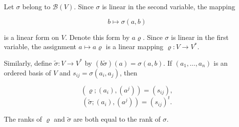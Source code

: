 Let $\sigma$ belong to $\mathcal{B}(V)$. Since $\sigma$ is linear in the second variable, the mapping

$$b \mapsto \sigma(a, b)$$

is a linear form on $V$. Denote this form by $a\varrho$. Since $\sigma$ is linear in the first variable, the assignment $a \mapsto a\varrho$ is a linear mapping $\varrho: V \to V^*$.

Similarly, define $\tilde{\sigma}: V \to V^*$ by $(b\tilde{\sigma})(a) = \sigma(a, b)$. If $(a_1, \ldots, a_n)$ is an ordered basis of $V$ and $s_{ij} = \sigma(a_i, a_j)$, then

$$(\varrho; (a_i), (a^j)) = (s_{ij}),$$
$$(\tilde{\sigma}; (a_i), (a^j)) = (s_{ij})^t.$$

The ranks of $\varrho$ and $\tilde{\sigma}$ are both equal to the rank of $\sigma$.
